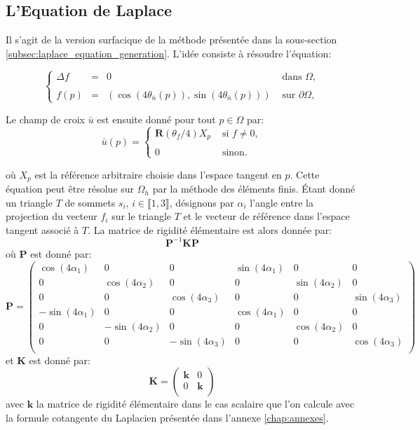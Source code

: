 \subsection{L'Equation de Laplace}
\label{subsec:laplace_equation_generation_space}

Il s'agit de la version surfacique de la méthode présentée dans la sous-section \ref{subsec:laplace_equation_generation}. L'idée consiste à résoudre l'équation:

\begin{equation}
\left\{
\begin{array}{lcll}
\Delta f &=& 0 &\mbox{ dans }\Omega,\\\\
f(p)&=&\left(\cos(4\theta_{\bar{n}}(p)), \sin(4\theta_{\bar{n}}(p))\right) & \mbox{ sur } \partial\Omega,
\end{array}
\right.
\label{eqn:frey_vectoriel}
\end{equation}

Le champ de croix $\bar{u}$ est ensuite donné pour tout $p\in\Omega$ par:
$$
\bar{u}(p)=
\left\{
\begin{array}{ll}
\mathbf{R}(\theta_f/4)X_p& \mbox{ si }f\neq 0,\\\\
0&\mbox{ sinon}.
\end{array}
\right.
$$

où $X_p$ est la référence arbitraire choisie dans l'espace tangent en $p$. Cette équation peut être résolue sur $\Omega_h$ par la méthode des éléments finis. Étant donné un triangle $T$ de sommets $s_i$, $i\in\llbracket1, 3\rrbracket$, désignons par $\alpha_i$ l'angle entre la projection du vecteur $f_i$ sur le triangle $T$ et le vecteur de référence dans l'espace tangent associé à $T$. La matrice de rigidité élémentaire est alors donnée par:
$$
\mathbf{P}^{-1}\mathbf{K}\mathbf{P}
$$
où $\mathbf{P}$ est donné par:
$$
\mathbf{P}=
\begin{pmatrix}
\cos(4\alpha_1) & 0 & 0 & \sin(4\alpha_1) & 0 & 0 \\
0 & \cos(4\alpha_2) & 0 & 0 & \sin(4\alpha_2) & 0 \\
0 & 0 & \cos(4\alpha_3) & 0 & 0 & \sin(4\alpha_3) \\
-\sin(4\alpha_1) & 0 & 0 & \cos(4\alpha_1) & 0 & 0 \\
0 & -\sin(4\alpha_2) & 0 & 0 & \cos(4\alpha_2) & 0 \\
0 & 0 & -\sin(4\alpha_3) & 0 & 0 & \cos(4\alpha_3) \\
\end{pmatrix}
$$
et $\mathbf{K}$ est donné par:
$$
\mathbf{K}=
\begin{pmatrix}
\mathbf{k} & 0 \\
0 & \mathbf{k} \\
\end{pmatrix}
$$
avec $\mathbf{k}$ la matrice de rigidité élémentaire dans le cas scalaire que l'on calcule avec la formule cotangente du Laplacien présentée dans l'annexe \ref{chap:annexes}.



